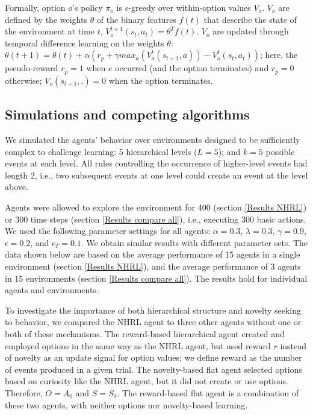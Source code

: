\documentclass{article}
\begin{document}
Formally, option $o$'s policy $\pi_o$ is $\epsilon$-greedy over within-option values $V_o$. $V_o$ are defined by the weights $\theta$ of the binary features $f(t)$ that describe the state of the environment at time $t$, $V_o^{t+1}(s_t, a_t) = \theta^T f(t)$. 
$V_o$ are updated through temporal difference learning on the weights $\theta$: $\theta(t+1) = \theta(t) + \alpha (r_p + \gamma max_a(V_o^{t}(s_{t+1}, a)) - V_o^{t}(s_t, a_t))$; here, the pseudo-reward $r_p = 1$ when $e$ occurred (and the option terminates) and $r_p = 0$ otherwise; $V_o(s_{t+1},.) = 0$ when the option terminates. 

\subsection{Simulations and competing algorithms} \label{Comparison agents}

We simulated the agents' behavior over environments designed to be sufficiently complex to challenge learning: 5 hierarchical levels ($L = 5$); and $k = 5$ possible events at each level. All rules controlling the occurrence of higher-level events had length 2, i.e., two subsequent events at one level could create an event at the level above.%

Agents were allowed to explore the environment for 400 (section \ref{Results NHRL}) or 300 time steps (section \ref{Results compare all}), i.e., executing 300 basic actions. We used the following parameter settings for all agents: $\alpha = 0.3$, $\lambda = 0.3$, $\gamma = 0.9$, $\epsilon = 0.2$, and $\epsilon_T = 0.1$. We obtain similar results with different parameter sets. The data shown below are based on the average performance of 15 agents in a single environment (section \ref{Results NHRL}), and the average performance of 3 agents in 15 environments (section \ref{Results compare all}). The results hold for individual agents and environments.

To investigate the importance of both hierarchical structure and novelty seeking to behavior, we compared the NHRL agent to three other agents without one or both of these mechanisms. The reward-based hierarchical agent created and employed options in the same way as the NHRL agent, but used reward $r$ instead of novelty as an update signal for option values; we define reward as the number of events produced in a given trial.
The novelty-based flat agent selected options based on curiosity like the NHRL agent, but it did not create or use options. Therefore, $O = A_0$ and $S = S_0$. The reward-based flat agent is a combination of these two agents, with neither options nor novelty-based learning.
\end{document}
